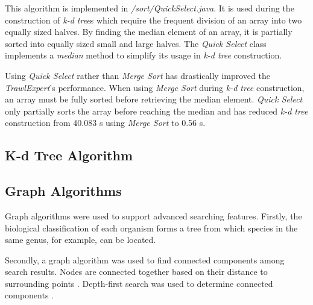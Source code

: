\documentclass{article}
\begin{document}
This algorithm is implemented in \textit{/sort/QuickSelect.java}. It is used during the construction of \textit{k-d tree}s which require the frequent division of an array into two equally sized halves. By finding the median element of an array, it is partially sorted into equally sized small and large halves. The \textit{Quick Select} class implements a \textit{median} method to simplify its usage in \textit{k-d tree} construction. 

Using \textit{Quick Select} rather than \textit{Merge Sort} has drastically improved the \textit{TrawlExpert}'s performance. When using \textit{Merge Sort} during \textit{k-d tree} construction, an array must be fully sorted before retrieving the median element. \textit{Quick Select} only partially sorts the array before reaching the median and has reduced \textit{k-d tree} construction from 40.083 s using \textit{Merge Sort} to 0.56 s. 


\subsection{K-d Tree Algorithm}

\subsection{Graph Algorithms}
Graph algorithms were used to support advanced searching features. Firstly, the biological classification of each organism forms a tree from which species in the same genus, for example, can be located. 

Secondly, a graph algorithm was used to find connected components among search results. Nodes are connected together based on their distance to surrounding points \citep{tom10}. Depth-first search was used to determine connected components \citep{broder2000graph}.


\clearpage


\end{document}
